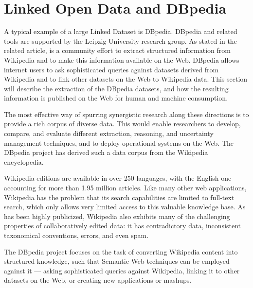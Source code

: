 \documentclass[thesis=M,english,hidelinks]{FITthesis}[2019/12/23]
\begin{document}
\section{Linked Open Data and DBpedia}

A typical example of a large Linked Dataset is DBpedia. DBpedia and related tools are supported by the Leipzig University research group. As stated in the related article, is a community effort to extract structured information from Wikipedia and to make this information available on the Web. DBpedia allows internet users to ask sophisticated queries against datasets derived from Wikipedia and to link other datasets on the Web to Wikipedia data. This section will describe the extraction of the DBpedia datasets, and how the resulting information is published on the Web for human and machine consumption\cite{dbpedia_nucleus}.

The most effective way of spurring synergistic research along these directions is to provide a rich corpus of diverse data. This would enable researchers to develop, compare, and evaluate different extraction, reasoning, and uncertainty management techniques, and to deploy operational systems on the Web. The DBpedia project has derived such a data corpus from the Wikipedia encyclopedia.

Wikipedia editions are available in over 250 languages, with the English one accounting for more than 1.95 million articles. Like many other web applications, Wikipedia has the problem that its search capabilities are limited to full-text search, which only allows very limited access to this valuable knowledge base. As has been highly publicized, Wikipedia also exhibits many of the challenging properties of collaboratively edited data: it has contradictory data, inconsistent taxonomical conventions, errors, and even spam. 

The DBpedia project focuses on the task of converting Wikipedia content into structured knowledge, such that Semantic Web techniques can be employed against it — asking sophisticated queries against Wikipedia, linking it to other datasets on the Web, or creating new applications or mashups.
\end{document}
